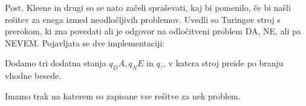 \documentclass[10pt,a4paper,oneside]{book}
\begin{document}
\begin{neurejeno}
Post, Kleene in drugi so se nato začeli spraševati, kaj bi pomenilo, če bi našli rešitev za enega izmed neodločljivih problemov.
Uvedli so Turingov stroj s prerokom, ki zna povedati ali je odgovor na odločitveni problem DA, NE, ali pa NEVEM.
Pojavljata se dve implementaciji:
\begin{items}
\item Dodamo tri dodatna stanja $q_DA, q_NE$ in $q_?$, v katera stroj preide po branju vhodne besede.
\item Imamo trak na katerem so zapisane vse rešitve za nek problem.
\end{items}


\end{neurejeno}
\end{document}
